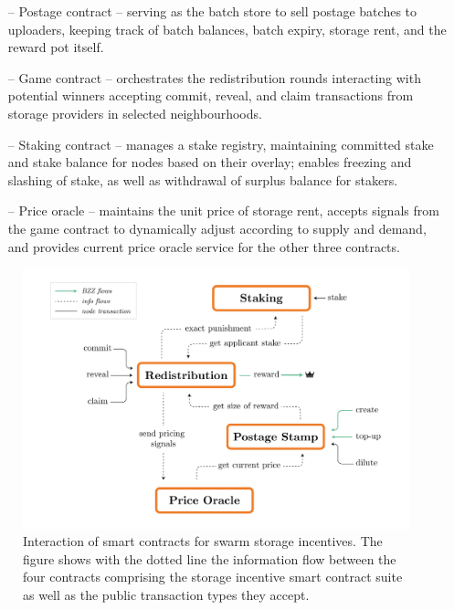 \begin{itemize}
    \item[--] Postage contract -- serving as the batch store to sell postage batches to uploaders, keeping track of batch balances, batch expiry, storage rent, and the reward pot itself.
    \item[--] Game contract -- orchestrates the redistribution rounds interacting with potential winners accepting commit, reveal, and claim transactions from storage providers in selected neighbourhoods.
    \item[--] Staking contract -- manages a stake registry, maintaining committed stake and stake balance for nodes based on their overlay; enables freezing and slashing of stake, as well as withdrawal of surplus balance for stakers.
    \item[--] Price oracle -- maintains the unit price of  storage rent, accepts signals from the game contract to dynamically adjust according to supply and demand, and provides current price oracle service for the other three contracts.
\end{itemize}


\begin{figure}[!ht]
  \centering
     \includegraphics[width=\textwidth]{fig/smart-contract-interaction.pdf}
  \caption[Interaction of smart contracts for swarm storage incentives]{Interaction of smart contracts for swarm storage incentives. The figure shows with the dotted line the information flow between the four contracts comprising the storage incentive smart contract suite as well as the public transaction types they accept. }
\label{fig:smart-contracts}
\end{figure}    

